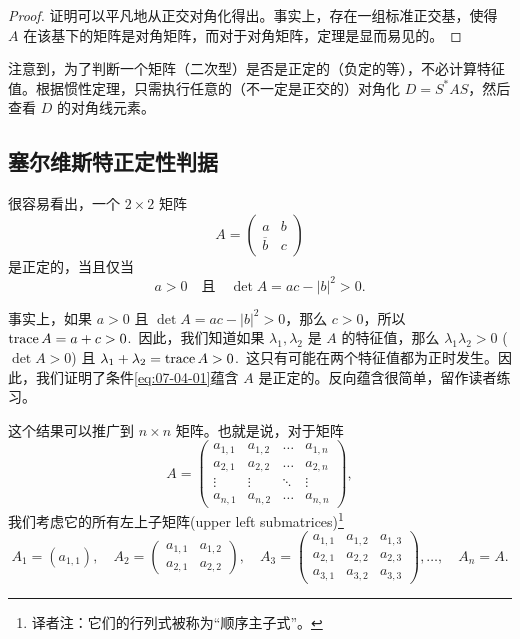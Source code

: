 \begin{proof}
证明可以平凡地从正交对角化得出。事实上，存在一组标准正交基，使得 $A$ 在该基下的矩阵是对角矩阵，而对于对角矩阵，定理是显而易见的。\end{proof}

\begin{remark*}
注意到，为了判断一个矩阵（二次型）是否是正定的（负定的等），不必计算特征值。根据惯性定理，只需执行任意的（不一定是正交的）对角化 $D = S^*AS$，然后查看 $D$ 的对角线元素。
\end{remark*}


\subsection{塞尔维斯特正定性判据}\label{sec:07-04-01}
很容易看出，一个 $2 \times 2$ 矩阵
$$A = \begin{pmatrix} a & b \\ \overline{b} & c \end{pmatrix}$$
是正定的，当且仅当
\begin{equation}\label{eq:07-04-01}
a > 0\quad\text{且} \quad\det A = ac - |b|^2 > 0.
\end{equation}

事实上，如果 $a > 0$ 且 $\det A = ac - |b|^2 > 0$，那么 $c > 0$，所以 $\operatorname{trace} A = a+c > 0$.~因此，我们知道如果 $\lambda_1, \lambda_2$ 是 $A$ 的特征值，那么 $\lambda_1\lambda_2 > 0$ ($\det A > 0$) 且 $\lambda_1 + \lambda_2 = \operatorname{trace} A > 0$.~这只有可能在两个特征值都为正时发生。因此，我们证明了条件\eqref{eq:07-04-01}蕴含 $A$ 是正定的。反向蕴含很简单，留作读者练习。

这个结果可以推广到 $n \times n$ 矩阵。也就是说，对于矩阵
$$A = \begin{pmatrix} a_{1,1} & a_{1,2} & \dots & a_{1,n} \\ a_{2,1} & a_{2,2} & \dots & a_{2,n} \\ \vdots & \vdots & \ddots & \vdots \\ a_{n,1} & a_{n,2} & \dots & a_{n,n} \end{pmatrix},$$
我们考虑它的所有左上子矩阵(upper left submatrices)\footnote{
译者注：它们的行列式被称为“顺序主子式”。
}
$$A_1 = (a_{1,1}),\quad A_2 = \begin{pmatrix} a_{1,1} & a_{1,2} \\ a_{2,1} & a_{2,2} \end{pmatrix},\quad A_3 = \begin{pmatrix} a_{1,1} & a_{1,2} & a_{1,3} \\ a_{2,1} & a_{2,2} & a_{2,3} \\ a_{3,1} & a_{3,2} & a_{3,3} \end{pmatrix}, \dots,\quad A_n = A.$$

